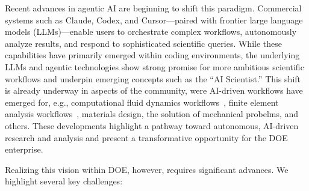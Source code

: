 \documentclass[11pt]{article} \usepackage[margin=1in]{geometry}
\begin{document}
Recent advances in agentic AI are beginning to shift this paradigm. Commercial
systems such as Claude, Codex, and Cursor—paired with frontier large language
models (LLMs)—enable users to orchestrate complex workflows, autonomously
analyze results, and respond to sophisticated scientific queries. While these
capabilities have primarily emerged within coding environments, the underlying
LLMs and agentic technologies show strong promise for more ambitious scientific workflows
and underpin emerging concepts such as the ``AI Scientist.'' This shift is
already underway in aspects of the community, were AI-driven workflows have
emerged for, e.g., computational fluid dynamics workflows~\cite{},
finite element analysis workflows~\cite{}, materials design, the solution of
mechanical probelms, and others. These developments
highlight a pathway toward autonomous, AI-driven research and analysis and
present a transformative opportunity for the DOE enterprise. 

Realizing this vision within DOE, however, requires significant advances. We
highlight several key challenges:
\end{document}

